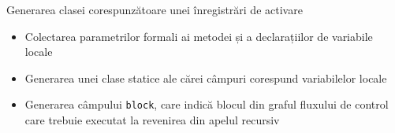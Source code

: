 \documentclass{beamer}
\def\code#1{\texttt{#1}}
\begin{document}
\begin{frame}{Generarea clasei corespunzătoare unei înregistrări de activare}
    \begin{itemize}
        \item Colectarea parametrilor formali ai metodei și a declarațiilor de variabile locale
        \item Generarea unei clase statice ale cărei câmpuri corespund variabilelor locale
        \item Generarea câmpului \code{block}, care indică blocul din graful fluxului de control care trebuie executat
        la revenirea din apelul recursiv
    \end{itemize}
\end{frame}
\end{document}
